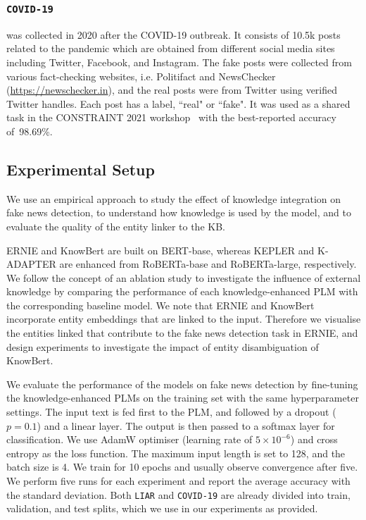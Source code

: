 \documentclass[letterpaper]{article} %
\begin{document}
\subsubsection{\texttt{COVID-19}} was collected in 2020 after the COVID-19 outbreak.
It consists of 10.5k posts related to the pandemic which are obtained from different social media sites including Twitter, Facebook, and Instagram.
The fake posts were collected from various fact-checking websites, i.e. Politifact and NewsChecker (\url{https://newschecker.in}), and the real posts were from Twitter using verified Twitter handles.
Each post has a label, ``real" or ``fake".
It was used as a shared task in the CONSTRAINT 2021 workshop~\cite{chakraborty2021combating} with the best-reported accuracy of~98.69\%.

\subsection{Experimental Setup}
We use an empirical approach to study the effect of knowledge integration on fake news detection, to understand how knowledge is used by the model, and to evaluate the quality of the entity linker to the KB.

ERNIE and KnowBert are built on BERT-base, whereas KEPLER and K-ADAPTER are enhanced from RoBERTa-base and RoBERTa-large, respectively.
We follow the concept of an ablation study to investigate the influence of external knowledge by comparing the performance of each knowledge-enhanced PLM with the corresponding baseline model.
We note that ERNIE and KnowBert incorporate entity embeddings that are linked to the input.
Therefore we visualise the entities linked that contribute to the fake news detection task in ERNIE, and design experiments to investigate the impact of entity disambiguation of KnowBert.

We evaluate the performance of the models on fake news detection by fine-tuning the knowledge-enhanced PLMs on the training set with the same hyperparameter settings.
The input text is fed first to the PLM, and followed by a dropout ($p=0.1$) and a linear layer. The output is then passed to a softmax layer for classification.
We use AdamW optimiser
\cite{Loshchilov_Hutter_2019_Decoupled} (learning rate of $5\times10^{-6}$) and cross entropy as the loss function.
The maximum input length is set to 128, and the batch size is 4.
We train for 10 epochs and usually observe convergence after five.
We perform five runs for each experiment and report the average accuracy with the standard deviation.
Both \texttt{LIAR} and \texttt{COVID-19} are already divided into train, validation, and test splits, which we use in our experiments as provided.
\end{document}
